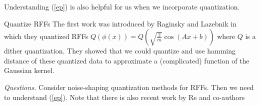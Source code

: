 \begin{itemize}
Understanding (\ref{ep}) is also helpful for us when we incorporate quantization.


{Quantize RFFs}
The first work was introduced by Raginsky and Lazebnik \cite{RL2009} in which they quantized RFFs $Q(\phi(x)) = Q(\sqrt{\frac{2}{m}}\cos(Ax + b))$ where $Q$ is a dither quantization. They showed that we could quantize and use hamming distance of these quantized data to approximate a (complicated) function of the Gaussian kernel.

\textit{Questions.} Consider noise-shaping quantization methods for RFFs. Then we need to understand (\ref{ep}). Note that there is also recent work by Re and co-authors \cite{Zhang2018}

\end{itemize}

